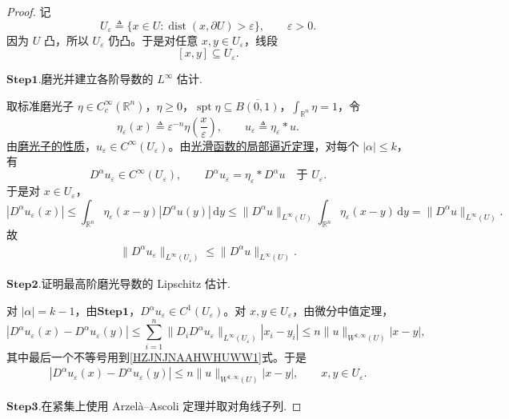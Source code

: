 \documentclass[../../main.tex]{subfiles}
\begin{document}
\begin{proof}

记
\[
U_\varepsilon
\triangleq
\{x\in U:\operatorname{dist}(x,\partial U)>\varepsilon\},
\qquad
\varepsilon>0.
\]
因为 \(U\) 凸，所以 \(U_\varepsilon\) 仍凸。于是对任意 \(x,y\in U_\varepsilon\)，线段
\[
[x,y]\subseteq U_\varepsilon.
\]

\noindent$\mathbf{Step}\bm{1}$.{\heiti 磨光并建立各阶导数的 \(L^{\infty}\) 估计.}

取标准磨光子 \(\eta\in C_c^\infty(\mathbb R^n)\)，\(\eta\geqslant0\)，\(\operatorname{spt}\eta\subseteq\overline{B(0,1)}\)，\(\int_{\mathbb R^n}\eta=1\)，令
\[
\eta_\varepsilon(x)\triangleq\varepsilon^{-n}\eta\left(\frac{x}{\varepsilon}\right),
\qquad
u_\varepsilon\triangleq\eta_\varepsilon*u.
\]
由\hyperref[theorem:appC-光滑算子的性质]{磨光子的性质}，\(u_\varepsilon\in C^\infty(U_\varepsilon)\)。由\hyperref[theorem:ch05-光滑函数的局部逼近定理]{光滑函数的局部逼近定理}，对每个 \(|\alpha|\leqslant k\)，有
\[
D^\alpha u_\varepsilon\in C^\infty(U_\varepsilon),
\qquad
D^\alpha u_\varepsilon=\eta_\varepsilon*D^\alpha u
\quad\text{于 }U_\varepsilon.
\]
于是对 \(x\in U_\varepsilon\)，
\[
|D^\alpha u_\varepsilon(x)|
\leqslant
\int_{\mathbb R^n}\eta_\varepsilon(x-y)|D^\alpha u(y)|\,\mathrm{d}y
\leqslant
\|D^\alpha u\|_{L^\infty(U)}
\int_{\mathbb R^n}\eta_\varepsilon(x-y)\,\mathrm{d}y
=
\|D^\alpha u\|_{L^\infty(U)}.
\]
故
\begin{align}
\|D^\alpha u_\varepsilon\|_{L^\infty(U_\varepsilon)}
\leqslant
\|D^\alpha u\|_{L^\infty(U)}.\label{HZJNJNAAHWHUWW1}
\end{align}

\noindent$\mathbf{Step}\bm{2}$.{\heiti 证明最高阶磨光导数的 Lipschitz 估计.}

对 \(|\alpha|=k-1\)，由$\mathbf{Step}\bm{1}$，\(D^\alpha u_\varepsilon\in C^1(U_\varepsilon)\)。对 \(x,y\in U_\varepsilon\)，由微分中值定理，
\[
|D^\alpha u_\varepsilon(x)-D^\alpha u_\varepsilon(y)|
\leqslant
\sum_{i=1}^n
\|D_iD^\alpha u_\varepsilon\|_{L^\infty(U_\varepsilon)}
|x_i-y_i|
\leqslant
n\|u\|_{W^{k,\infty}(U)}|x-y|,
\]
其中最后一个不等号用到\eqref{HZJNJNAAHWHUWW1}式。于是
\begin{align}
|D^\alpha u_\varepsilon(x)-D^\alpha u_\varepsilon(y)|
\leqslant
n\|u\|_{W^{k,\infty}(U)}|x-y|,
\qquad
x,y\in U_\varepsilon.\label{HZJNJNAAHWHUWW2}
\end{align}

\noindent$\mathbf{Step}\bm{3}$.{\heiti 在紧集上使用 Arzelà--Ascoli 定理并取对角线子列.}


\end{proof}
\end{document}
